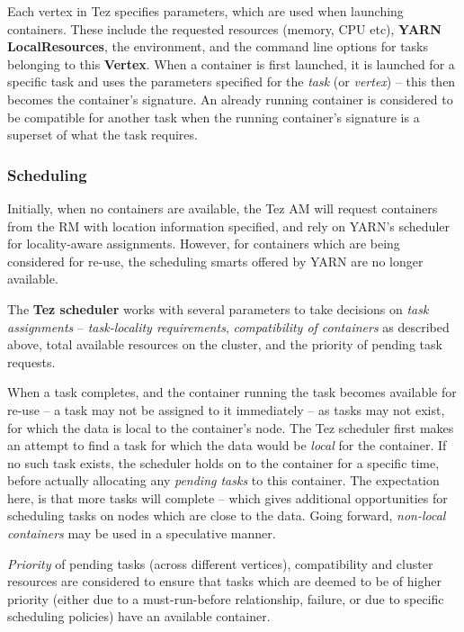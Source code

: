 \documentclass[twocolumn]{article}
\begin{document}
Each vertex in Tez specifies parameters, which are used when launching
containers. These include the requested resources (memory, CPU etc),
\textbf{YARN LocalResources}, the environment, and the command line
options for tasks belonging to this \textbf{Vertex}. When a container is
first launched, it is launched for a specific task and uses the
parameters specified for the \emph{task} (or \emph{vertex}) -- this then
becomes the container's signature. An already running container is
considered to be compatible for another task when the running
container's signature is a superset of what the task requires.

\subsubsection{Scheduling}

Initially, when no containers are available, the Tez AM will request
containers from the RM with location information specified, and rely on
YARN's scheduler for locality-aware assignments. However, for containers
which are being considered for re-use, the scheduling smarts offered by
YARN are no longer available.

The \textbf{Tez scheduler} works with several parameters to take
decisions on \emph{task assignments} -- \emph{task-locality
requirements}, \emph{compatibility of containers} as described above,
total available resources on the cluster, and the priority of pending
task requests.

When a task completes, and the container running the task becomes
available for re-use -- a task may not be assigned to it immediately --
as tasks may not exist, for which the data is local to the container's
node. The Tez scheduler first makes an attempt to find a task for which
the data would be \emph{local} for the container. If no such task
exists, the scheduler holds on to the container for a specific time,
before actually allocating any \emph{pending tasks} to this container.
The expectation here, is that more tasks will complete -- which gives
additional opportunities for scheduling tasks on nodes which are close
to the data. Going forward, \emph{non-local containers} may be used in a
speculative manner.

\emph{Priority} of pending tasks (across different vertices),
compatibility and cluster resources are considered to ensure that tasks
which are deemed to be of higher priority (either due to a
must-run-before relationship, failure, or due to specific scheduling
policies) have an available container.
\end{document}
